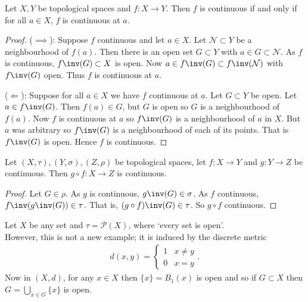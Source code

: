 \begin{proposition} \label{prp:27}
Let $X,Y$ be topological spaces and $f: X \to Y$. Then $f$ is continuous if and only if for all $a\in X$, $f$ is continuous at $a$.
\end{proposition}

\begin{proof}
($\implies$): Suppose $f$ continuous and let $a\in X$. Let $\mathcal{N}\subset Y$ be a neighbourhood of $f(a)$.
Then there is an open set $G\subset Y$ with $a\in G\subset \mathcal{N}$.
As $f$ is continuous, $f\inv(G)\subset X$ is open.
Now $a\in f\inv(G) \subset f\inv(\mathcal{N})$ with $f\inv(G)$ open. Thus $f$ is continuous at $a$.

($\Longleftarrow$): Suppose for all $a \in X$ we have $f$ continuous at $a$.
Let $G\subset Y$ be open.
Let $a \in f\inv(G)$.
Then $f(a) \in G$, but $G$ is open so $G$ is a neighbourhood of $f(a)$.
Now $f$ is continuous at $a$ so $f\inv(G)$ is a neighbourhood of $a$ in $X$.
But $a$ was arbitrary so $f\inv(G)$ is a neighbourhood of each of its points.
That is $f\inv(G)$ is open.
Hence $f$ is continuous.
\end{proof}

\begin{proposition} \label{prp:28}
Let $(X,\tau), (Y,\sigma), (Z,\rho)$ be topological spaces, let $f:X \to Y$ and $g:Y \to Z$ be continuous. Then $g\circ f: X \to Z$ is continuous.
\end{proposition}

\begin{proof}
Let $G\in \rho$. As $g$ is continuous, $g\inv(G)\in \sigma$. As $f$ continuous, $f\inv(g\inv(G))\in \tau$. That is, $(g\circ f)\inv(G)\in \tau$. So $g\circ f$ continuous.
\end{proof}

\begin{example}
    Let $X$ be any set and $\tau = \mathcal{P}(X)$, where `every set is open'. \\
    However, this is not a new example; it is induced by the discrete metric \begin{align*}
        d(x, y) = \begin{cases}
            1 & x \neq y \\
            0 & x = y
        \end{cases}.
    \end{align*}
    Now in $(X,d)$, for any $x\in X$ then $\{x\} = B_1(x)$ is open and so if $G\subset X$ then $G = \bigcup_{x\in G} \{x\}$ is open.
\end{example}

